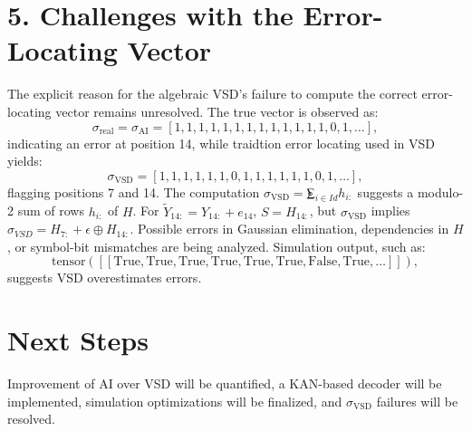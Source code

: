 \documentclass[a4paper,12pt]{article}
\begin{document}
\section*{5. Challenges with the Error-Locating Vector}
The explicit reason for the algebraic VSD’s failure to compute the correct error-locating vector remains unresolved. The true vector is observed as:
\[
\sigma_{\text{real}} = \sigma_{\text{AI}} = [1, 1, 1, 1, 1, 1, 1, 1, 1, 1, 1, 1, 1, 0, 1, \dots],
\]
indicating an error at position 14, while traidtion error locating used in VSD yields:
\[
\sigma_{\text{VSD}} = [1, 1, 1, 1, 1, 1, 0, 1, 1, 1, 1, 1, 1, 0, 1, \dots],
\]
flagging positions 7 and 14. The computation \(\sigma_{\text{VSD}} = \modtwosum_{i\in Id} h_{i:}\) suggests a modulo-2 sum of rows \(h_{i:}\) of \(H\). For \(\tilde{Y}_{14:} = Y_{14:} + e_{14}\), \(S = H_{14:}\), but \(\sigma_{\text{VSD}}\) implies \(\sigma_{VSD} = H_{7:}+\epsilon \oplus H_{14:}\). Possible errors in Gaussian elimination, dependencies in \(H\), or symbol-bit mismatches are being analyzed. Simulation output, such as:
\[
\text{tensor}([[ \text{True}, \text{True}, \text{True}, \text{True}, \text{True}, \text{True}, \text{False}, \text{True}, \dots ]]),
\]
suggests VSD overestimates errors.

\section*{Next Steps}
Improvement of AI over VSD will be quantified, a KAN-based decoder will be implemented, simulation optimizations will be finalized, and \(\sigma_{\text{VSD}}\) failures will be resolved.
\end{document}
